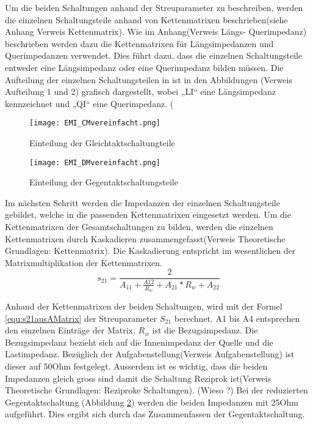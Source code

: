 Um die beiden Schaltungen anhand der Streuparameter zu beschreiben, werden die einzelnen Schaltungsteile anhand von Kettenmatrixen beschrieben(siehe Anhang Verweis Kettenmatrix). Wie im Anhang(Verweis Längs- Querimpedanz) beschrieben werden dazu die Kettenmatrixen für Längsimpedanzen und Querimpedanzen verwendet. Dies führt dazu, dass die einzelnen Schaltungsteile entweder eine Längsimpedanz oder eine Querimpedanz bilden müssen. Die Aufteilung der einzelnen Schaltungsteilen in ist in den Abbildungen (Verweis Aufteilung 1 und 2) grafisch dargestellt, wobei „LI“ eine Längsimpedanz kennzeichnet und „QI“ eine Querimpedanz. (%
\begin{figure}[H]
		\centering
		\texttt{[image: EMI\_CMvereinfacht.png]}
		\label{fig:cmschaltung}
		\caption{Einteilung der Gleichtaktschaltungteile}
\end{figure}

\begin{figure}[H]
		\centering
		\texttt{[image: EMI\_DMvereinfacht.png]}
		\label{fig:dmschaltung}
		\caption{Einteilung der Gegentaktschaltungsteile}
\end{figure}

Im nächsten Schritt werden die Impedanzen der einzelnen Schaltungsteile gebildet, welche in die passenden Kettenmatrixen eingesetzt werden. Um die Kettenmatrixen der Gesamtschaltungen zu bilden, werden die einzelnen Kettenmatrixen durch Kaskadieren zusammengefasst(Verweis Theoretische Grundlagen: Kettenmatrix). Die Kaskadierung entspricht im wesentlichen der Matrixmultiplikation der Kettenmatrixen. \\

\begin{equation}\label{equ:s21ausAMatrix}
s_{21} = \frac{2}{A_{11}+\frac{A{12}}{R_w}+A_{21}*R_w+A_{22}}
\end{equation}

Anhand der Kettenmatrixen der beiden Schaltungen, wird mit der Formel \ref{equ:s21ausAMatrix} der Streuparameter $S_{21}$ berechnet. A1 bis A4 entsprechen den einzelnen Einträge der Matrix. $R_w$ ist die Bezugsimpedanz. Die Bezugsimpedanz bezieht sich auf die Innenimpedanz der Quelle und die Lastimpedanz. Bezüglich der Aufgabenstellung(Verweis Aufgabenstellung) ist dieser auf 50Ohm festgelegt. Ausserdem ist es wichtig, dass die beiden Impedanzen gleich gross sind damit die Schaltung Reziprok ist(Verweis Theoretische Grundlagen: Reziproke Schaltungen). (Wieso ?) 
Bei der reduzierten Gegentaktschaltung (Abbildung \ref{fig:dmschaltung}) werden die beiden Impedanzen mit 25Ohm aufgeführt. Dies ergibt sich durch das Zusammenfassen der Gegentaktschaltung.\\


